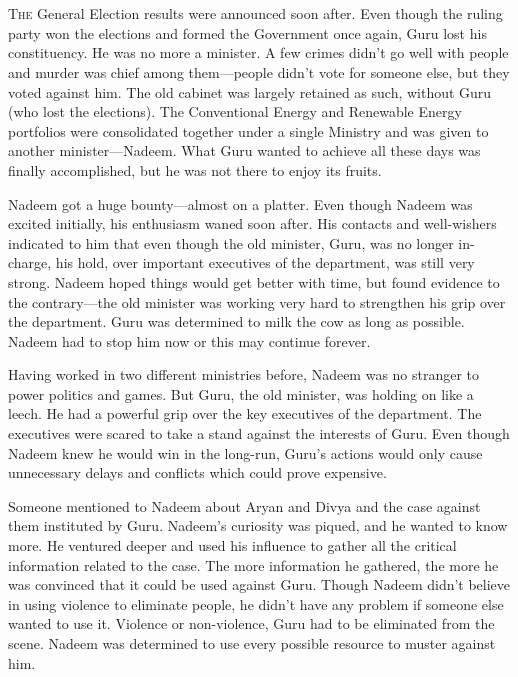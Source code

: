 \chapter{}

\lettrine{T}{he} General Election results were announced soon after. Even though the ruling
party won the elections and formed the Government once again, Guru lost his
constituency. He was no more a minister. A few crimes didn't go well with people
and murder was chief among them—people didn't vote for someone else, but they
voted against him. The old cabinet was largely retained as such, without Guru
(who lost the elections). The Conventional Energy and Renewable Energy
portfolios were consolidated together under a single Ministry and was given to
another minister—Nadeem. What Guru wanted to achieve all these days was
finally accomplished, but he was not there to enjoy its fruits.

Nadeem got a huge bounty—almost on a platter. Even though Nadeem was excited
initially, his enthusiasm waned soon after. His contacts and well-wishers
indicated to him that even though the old minister, Guru, was no longer
in-charge, his hold, over important executives of the department, was still very
strong. Nadeem hoped things would get better with time, but found evidence to
the contrary—the old minister was working very hard to strengthen his grip
over the department. Guru was determined to milk the cow as long as possible.
Nadeem had to stop him now or this may continue forever.

Having worked in two different ministries before, Nadeem was no stranger to
power politics and games. But Guru, the old minister, was holding on like a
leech. He had a powerful grip over the key executives of the department. The
executives were scared to take a stand against the interests of Guru. Even
though Nadeem knew he would win in the long-run, Guru's actions would only cause
unnecessary delays and conflicts which could prove expensive.

Someone mentioned to Nadeem about Aryan and Divya and the case against them
instituted by Guru. Nadeem's curiosity was piqued, and he wanted to know more. He
ventured deeper and used his influence to gather all the critical information
related to the case. The more information he gathered, the more he was convinced
that it could be used against Guru. Though Nadeem didn't believe in using
violence to eliminate people, he didn't have any problem if someone else wanted
to use it. Violence or non-violence, Guru had to be eliminated from the scene.
Nadeem was determined to use every possible resource to muster against him.

